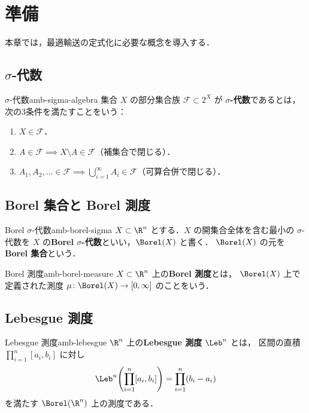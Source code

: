 \chapter{準備}
\label{ch:preliminaries}

本章では，最適輸送の定式化に必要な概念を導入する．

\section{$\sigma$-代数}
\label{sec:sigma-algebra}

\begin{definition}{$\sigma$-代数}{amb-sigma-algebra}
  集合 $X$ の部分集合族 $\mathcal{F} \subset 2^X$ が
  \textbf{$\sigma$-代数}であるとは，次の3条件を満たすことをいう：
  \begin{enumerate}
    \item $X \in \mathcal{F}$．
    \item $A \in \mathcal{F} \implies X \setminus A \in \mathcal{F}$（補集合で閉じる）．
    \item $A_1, A_2, \ldots \in \mathcal{F} \implies
      \bigcup_{i=1}^\infty A_i \in \mathcal{F}$（可算合併で閉じる）．
  \end{enumerate}
\end{definition}

\section{Borel 集合と Borel 測度}
\label{sec:borel}

\begin{definition}{Borel $\sigma$-代数}{amb-borel-sigma}
  $X \subset \R^n$ とする．$X$ の開集合全体を含む最小の $\sigma$-代数を
  $X$ の\textbf{Borel $\sigma$-代数}といい，$\Borel(X)$ と書く．
  $\Borel(X)$ の元を\textbf{Borel 集合}という．
\end{definition}

\begin{definition}{Borel 測度}{amb-borel-measure}
  $X \subset \R^n$ 上の\textbf{Borel 測度}とは，
  $\Borel(X)$ 上で定義された測度
  $\mu \colon \Borel(X) \to [0, \infty]$ のことをいう．
\end{definition}

\section{Lebesgue 測度}
\label{sec:lebesgue}

\begin{definition}{Lebesgue 測度}{amb-lebesgue}
  $\R^n$ 上の\textbf{Lebesgue 測度} $\Leb^n$ とは，
  区間の直積 $\prod_{i=1}^n [a_i, b_i]$ に対し
  \[
    \Leb^n\!\left(\prod_{i=1}^n [a_i, b_i]\right) = \prod_{i=1}^n (b_i - a_i)
  \]
  を満たす $\Borel(\R^n)$ 上の測度である．
\end{definition}

